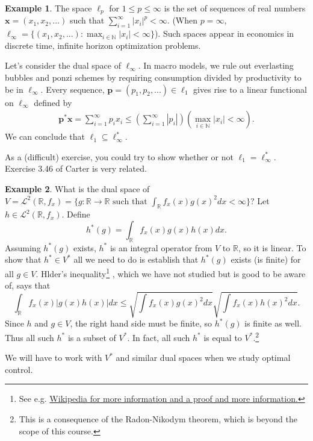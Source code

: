 \documentclass[12pt,reqno]{amsart}
\def\R{\mathbb{R}}
\theoremstyle{definition}
\newtheorem{example}{Example}[section]
\begin{document}
\begin{example}
  The space $\ell_p$ for $1 \leq p \leq \infty$ is the set of
  sequences of real numbers $\mathbf{x}=(x_1, x_2, ...)$ such that
  $\sum_{i=1}^\infty |x_i|^p < \infty$. (When $p = \infty$, $\ell_\infty = \{ 
  (x_1, x_2, ...) : \max_{i \in \mathbb{N}} |x_i| < \infty \}$). Such
  spaces appear in economics in discrete time, infinite horizon
  optimization problems. 

  Let's consider the dual space of $\ell_\infty$. In macro models, we
  rule out everlasting bubbles and ponzi schemes by requiring
  consumption divided by productivity to be in $\ell_\infty$. Every
  sequence, $\mathbf{p} = (p_1, p_2, ...) \in \ell_1$ gives rise to a linear
  functional on $\ell_\infty$ defined by
  \begin{align*}
    \mathbf{p}^\ast \mathbf{x} = \sum_{i=1}^\infty p_i x_i \leq
    \left(\sum_{i=1}^\infty |p_i| \right) \left(\max_{i \in
        \mathbb{N}} |x_i| < \infty\right). 
  \end{align*}
  We can conclude that $\ell_1 \subseteq \ell_\infty^\ast$. 

  As a (difficult) exercise, you could try to show whether or not
  $\ell_1 = \ell_\infty^\ast$. Exercise 3.46 of Carter is very
  related. 
\end{example}

\begin{example}
  What is the dual space of $V = \mathcal{L}^2(\R,f_x) = \{g:
  \R \to \R \text{ such that } \int_{\R} f_x(x) g(x)^2 dx <
  \infty\}$? Let $h \in \mathcal{L}^2(\R,f_x)$. Define 
  \[ h^\ast(g) = \int_\R f_x(x) g(x) h(x) dx. \] 
  Assuming $h^\ast(g)$
  exists, $h^\ast$ is an integral operator from $V$ to $\R$, so it is
  linear. To show that $h^\ast \in V^\ast$ all we need to do is
  establish that $h^\ast(g)$ exists (is finite) for all $g \in V$. 
  Hlder's inequality\footnote{See
    e.g.
    \href{http://en.wikipedia.org/wiki/H\%C3\%B6lder\%27s_inequality}
      {Wikipedia for more information and a proof and more
        information.}} , which we have not studied but is good to be
    aware of, says that
  \[ \int_\R f_x(x) |g(x) h(x)| dx \leq \sqrt{\int f_x(x) g(x)^2 dx}
  \sqrt{\int f_x(x) h(x)^2 dx}. \]
  Since $h$ and $g \in V$, the right hand side must be finite, so
  $h^\ast(g)$ is finite as well. Thus all such $h^\ast$ is a subset of
  $V^\ast$.   In fact, all such $h^\ast$ is equal to
  $V^\ast$.\footnote{This is a consequence of the Radon-Nikodym
    theorem, which is beyond the scope of this course.}

  We will have to work with $V^\ast$ and similar dual spaces when we
  study optimal control. 
\end{example}
\end{document}
